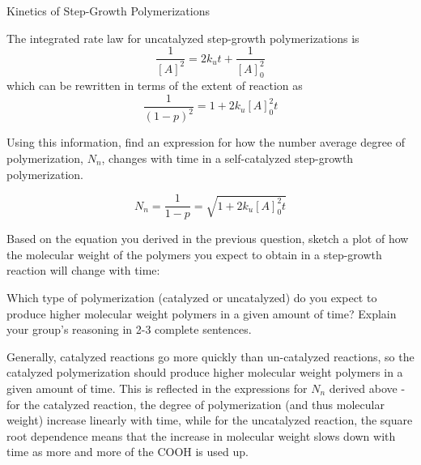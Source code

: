 \begin{activity}{Kinetics of Step-Growth Polymerizations}
\begin{ctqs}
\begin{enumerate}
		\end{enumerate}
	
\end{ctqs}

\begin{infobox}\label{\labelbase:info:uncatintrate}
	The integrated rate law for uncatalyzed step-growth polymerizations is
	\begin{equation*}
		\frac{1}{[A]^2} = 2k_u t + \frac{1}{[A]_0^2}
	\end{equation*}
	which can be rewritten in terms of the extent of reaction as
	\begin{equation*}
		\frac{1}{(1-p)^2} = 1 + 2k_u [A]_0^2 t
	\end{equation*}
\end{infobox}

\begin{ctqs}

	\question Using this information, find an expression for how the number average degree of polymerization, $N_n$, changes with time in a self-catalyzed step-growth polymerization.
	
		\begin{solution}[1.25in]
			\begin{equation*}
				N_n = \frac{1}{1-p} = \sqrt{1 + 2k_u [A]_0^2 t}
			\end{equation*}
		\end{solution}
		
	\question Based on the equation you derived in the previous question, sketch a plot of how the molecular weight of the polymers you expect to obtain in a step-growth reaction will change with time:
	
		\begin{solution}[2in]
		\end{solution}		
		
	\question Which type of polymerization (catalyzed or uncatalyzed) do you expect to produce higher molecular weight polymers in a given amount of time?  Explain your group's reasoning in 2-3 complete sentences.
	
		\begin{solution}[2in]
		
			Generally, catalyzed reactions go more quickly than un-catalyzed reactions, so the catalyzed polymerization should produce higher molecular weight polymers in a given amount of time.  This is reflected in the expressions for $N_n$ derived above - for the catalyzed reaction, the degree of polymerization (and thus molecular weight) increase linearly with time, while for the uncatalyzed reaction, the square root dependence means that the increase in molecular weight slows down with time as more and more of the COOH is used up.
		\end{solution}


\end{ctqs}
\end{activity}
